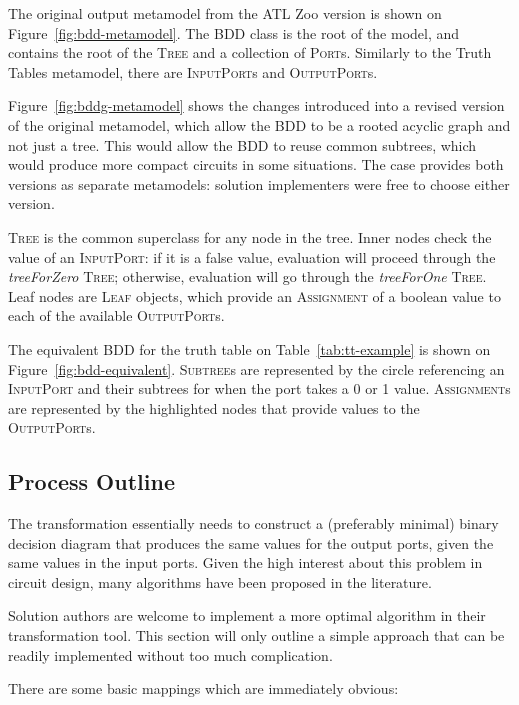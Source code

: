 \documentclass[a4paper]{article}
\newcommand*{\class}[1]{\textsc{#1}}
\newcommand*{\feature}[1]{\emph{#1}}
\begin{document}
The original output metamodel from the ATL Zoo version is shown on
Figure~\ref{fig:bdd-metamodel}. The \class{BDD} class is the root of the model,
and contains the root of the \class{Tree} and a collection of \class{Port}s.
Similarly to the Truth Tables metamodel, there are \class{Input\-Port}s and
\class{Output\-Port}s.

Figure~\ref{fig:bddg-metamodel} shows the changes introduced into a revised
version of the original metamodel, which allow the \class{BDD} to be a rooted
acyclic graph and not just a tree. This would allow the \class{BDD} to reuse
common subtrees, which would produce more compact circuits in some situations.
The case provides both versions as separate metamodels: solution implementers
were free to choose either version.

\class{Tree} is the common superclass for any node in the tree. Inner nodes
check the value of an \class{Input\-Port}: if it is a false value, evaluation
will proceed through the \feature{tree\-For\-Zero} \class{Tree}; otherwise,
evaluation will go through the \feature{tree\-For\-One} \class{Tree}. Leaf nodes
are \class{Leaf} objects, which provide an \class{Assignment} of a boolean value
to each of the available \class{Output\-Port}s.

The equivalent BDD for the truth table on Table~\ref{tab:tt-example} is shown on
Figure~\ref{fig:bdd-equivalent}. \class{Subtree}s are represented by the circle
referencing an \class{Input\-Port} and their subtrees for when the port takes a
0 or 1 value. \class{Assignment}s are represented by the highlighted nodes that
provide values to the \class{Output\-Port}s.

\subsection{Process Outline}
\label{sec:process-outline}

The transformation essentially needs to construct a (preferably minimal) binary
decision diagram that produces the same values for the output ports, given the
same values in the input ports. Given the high interest about this problem in
circuit design, many algorithms have been proposed in the literature.

Solution authors are welcome to implement a more optimal algorithm in their
transformation tool. This section will only outline a simple approach that can
be readily implemented without too much complication.

There are some basic mappings which are immediately obvious:
\end{document}
